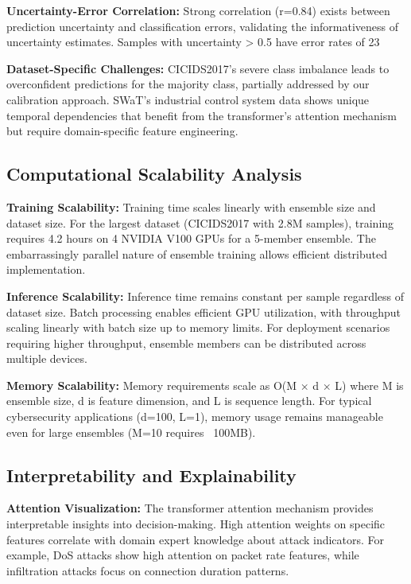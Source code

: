 \documentclass[journal]{IEEEtran}
\begin{document}
\textbf{Uncertainty-Error Correlation:} Strong correlation (r=0.84) exists between prediction uncertainty and classification errors, validating the informativeness of uncertainty estimates. Samples with uncertainty > 0.5 have error rates of 23%

\textbf{Dataset-Specific Challenges:} CICIDS2017's severe class imbalance leads to overconfident predictions for the majority class, partially addressed by our calibration approach. SWaT's industrial control system data shows unique temporal dependencies that benefit from the transformer's attention mechanism but require domain-specific feature engineering.

\subsection{Computational Scalability Analysis}

\textbf{Training Scalability:} Training time scales linearly with ensemble size and dataset size. For the largest dataset (CICIDS2017 with 2.8M samples), training requires 4.2 hours on 4 NVIDIA V100 GPUs for a 5-member ensemble. The embarrassingly parallel nature of ensemble training allows efficient distributed implementation.

\textbf{Inference Scalability:} Inference time remains constant per sample regardless of dataset size. Batch processing enables efficient GPU utilization, with throughput scaling linearly with batch size up to memory limits. For deployment scenarios requiring higher throughput, ensemble members can be distributed across multiple devices.

\textbf{Memory Scalability:} Memory requirements scale as O(M × d × L) where M is ensemble size, d is feature dimension, and L is sequence length. For typical cybersecurity applications (d=100, L=1), memory usage remains manageable even for large ensembles (M=10 requires ~100MB).

\subsection{Interpretability and Explainability}

\textbf{Attention Visualization:} The transformer attention mechanism provides interpretable insights into decision-making. High attention weights on specific features correlate with domain expert knowledge about attack indicators. For example, DoS attacks show high attention on packet rate features, while infiltration attacks focus on connection duration patterns.
\end{document}
